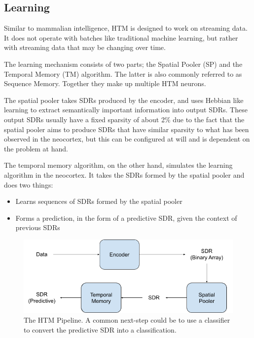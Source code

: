 \subsection{Learning}
Similar to mammalian intelligence, HTM is designed to work on streaming data. It does not operate with batches like traditional machine learning, but rather with streaming data that may be changing over time. \par
The learning mechanism consists of two parts; the Spatial Pooler (SP) and the Temporal Memory (TM) algorithm. The latter is also commonly referred to as Sequence Memory. Together they make up multiple HTM neurons.\par
The spatial pooler takes SDRs produced by the encoder, and uses Hebbian like learning to extract semantically important information into output SDRs. These output SDRs usually have a fixed sparsity of about 2\% due to the fact that the spatial pooler aims to produce SDRs that have similar sparsity to what has been observed in the neocortex, but this can be configured at will and is dependent on the problem at hand.\par
The temporal memory algorithm, on the other hand, simulates the learning algorithm in the neocortex. It takes the SDRs formed by the spatial pooler and does two things:
\begin{itemize}
    \item Learns sequences of SDRs formed by the spatial pooler
    \item Forms a prediction, in the form of a predictive SDR,  given the context of previous SDRs
\end{itemize}
\begin{figure}[H]
    \centering
    \includegraphics[width=\linewidth]{resources/related_works/htm_pipeline.png}
    \caption[The HTM Pipeline]{The HTM Pipeline. A common next-step could be to use a classifier to convert the predictive SDR into a classification. }
    \label{fig:htm_pipeline}
\end{figure}

